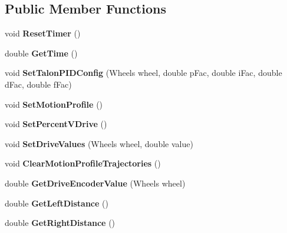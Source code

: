 \subsection*{Public Member Functions}
\begin{DoxyCompactItemize}
\item 
\mbox{\label{class_robot_model_a12fcf976a7f338c4d7dcba8b2765bbca}} 
void {\bfseries Reset\+Timer} ()
\item 
\mbox{\label{class_robot_model_a53211a6f086c2934f29696097e33c13c}} 
double {\bfseries Get\+Time} ()
\item 
\mbox{\label{class_robot_model_a5c46e71b1ecd43497fa6a552edee2850}} 
void {\bfseries Set\+Talon\+P\+I\+D\+Config} (Wheels wheel, double p\+Fac, double i\+Fac, double d\+Fac, double f\+Fac)
\item 
\mbox{\label{class_robot_model_a9e82ace9c9249288fd82b58a6ec1288e}} 
void {\bfseries Set\+Motion\+Profile} ()
\item 
\mbox{\label{class_robot_model_a00aec98c4ed4de1e7f48c2482fdad2a1}} 
void {\bfseries Set\+Percent\+V\+Drive} ()
\item 
\mbox{\label{class_robot_model_a98f996b588768ca75ca0cf2dddcd217c}} 
void {\bfseries Set\+Drive\+Values} (Wheels wheel, double value)
\item 
\mbox{\label{class_robot_model_ac34a7071a6f8e1cccc5b16acd966d512}} 
void {\bfseries Clear\+Motion\+Profile\+Trajectories} ()
\item 
\mbox{\label{class_robot_model_a79245b48351252c90a9ff994e9b40ebb}} 
double {\bfseries Get\+Drive\+Encoder\+Value} (Wheels wheel)
\item 
\mbox{\label{class_robot_model_a4fb9600c4ba5dc1594cd703bcc069683}} 
double {\bfseries Get\+Left\+Distance} ()
\item 
\mbox{\label{class_robot_model_acb69c744e99d5c938f983bf6da66f6f9}} 
double {\bfseries Get\+Right\+Distance} ()

\end{DoxyCompactItemize}

